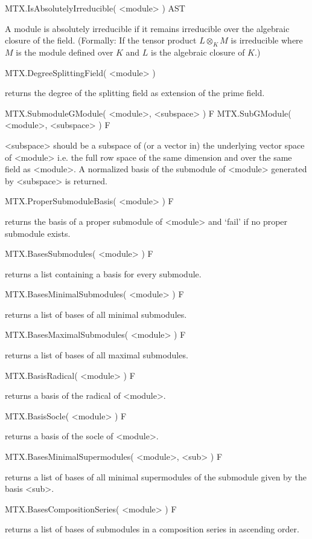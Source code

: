\>MTX.IsAbsolutelyIrreducible( <module> ) AST

A module is absolutely irreducible if it remains irreducible over the
algebraic closure of the field. (Formally: If the tensor product $L\otimes_K
M$ is irreducible where $M$ is the module defined over $K$ and $L$ is the
algebraic closure of $K$.)

\>MTX.DegreeSplittingField( <module> )

returns the degree of the splitting field as extension of the prime field.


\>MTX.SubmoduleGModule( <module>, <subspace> ) F
\>MTX.SubGModule( <module>, <subspace> ) F

<subspace> should be a subspace of (or a vector in) the underlying vector
space of <module> i.e. the full row space of the same dimension and over
the same field as <module>. A normalized basis of the submodule of
<module> generated by <subspace> is returned.

\>MTX.ProperSubmoduleBasis( <module> ) F

returns the basis of a proper submodule of <module> and `fail' if no proper
submodule exists.

\>MTX.BasesSubmodules( <module> ) F

returns a list containing a basis for every submodule.

\>MTX.BasesMinimalSubmodules( <module> ) F

returns a list of bases of all minimal submodules.

\>MTX.BasesMaximalSubmodules( <module> ) F

returns a list of bases of all maximal submodules.

\>MTX.BasisRadical( <module> ) F

returns a basis of the radical of <module>.

\>MTX.BasisSocle( <module> ) F

returns a basis of the socle of <module>.

\>MTX.BasesMinimalSupermodules( <module>, <sub> ) F

returns a list of bases of all minimal supermodules of the submodule given by
the basis <sub>.

\>MTX.BasesCompositionSeries( <module> ) F

returns a list of bases of submodules in a composition series in ascending
order.

